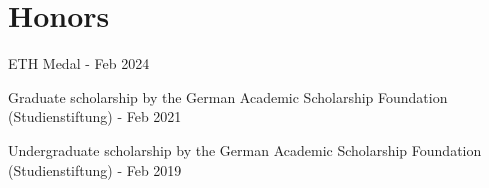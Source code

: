 \documentclass[a4paper,20pt]{article}
\begin{document}

\section{Honors}
\begin{description}[font=$\bullet$]
\item {ETH Medal - Feb 2024}
\vspace{-5pt}
\item {Graduate scholarship by the German Academic Scholarship Foundation (Studienstiftung) - Feb 2021}
\vspace{-5pt}
\item {Undergraduate scholarship by the German Academic Scholarship Foundation (Studienstiftung) - Feb 2019}
\end{description}
\end{document}

